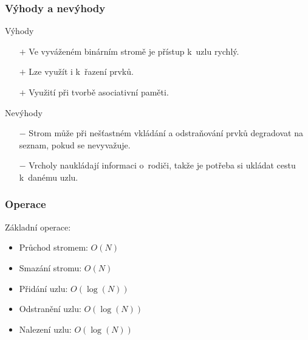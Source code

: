 \documentclass[10pt]{beamer}
\begin{document}
\begin{frame}\frametitle{Výhody a nevýhody}

    \begin{block}{Výhody}
        \begin{itemize}
            \item[$+$] Ve vyváženém binárním stromě je přístup k~uzlu rychlý.
            \item[$+$] Lze využít i k~řazení prvků.
            \item[$+$] Využití při tvorbě asociativní paměti.
        \end{itemize}
    \end{block}
    
    \begin{alertblock}{Nevýhody}
        \begin{itemize}
            \item[$-$] Strom může při nešťastném vkládání a odstraňování prvků degradovat na seznam, pokud se nevyvažuje.
            \item[$-$] Vrcholy naukládají informaci o~rodiči, takže je potřeba si ukládat cestu k~danému uzlu.
        \end{itemize}
    \end{alertblock}
    
\end{frame}

\begin{frame}\frametitle{Operace}

    Základní operace:
    \begin{itemize}
        \item Průchod stromem: $O(N)$
        \item Smazání stromu: $O(N)$
        \item Přidání uzlu: $O(\log(N))$
        \item Odstranění uzlu: $O(\log(N))$
        \item Nalezení uzlu: $O(\log(N))$
    \end{itemize}
    
\end{frame}
\end{document}
